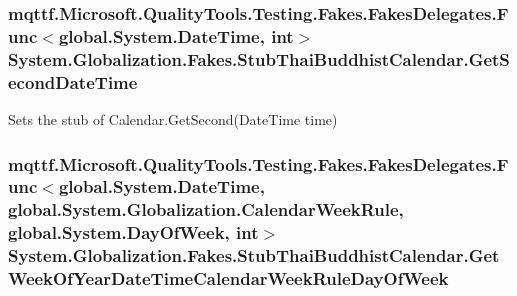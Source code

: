 \hypertarget{class_system_1_1_globalization_1_1_fakes_1_1_stub_thai_buddhist_calendar_a44f99d50865189a046508f36b6682c45}{
\subsubsection[{Get\-Second\-Date\-Time}]{\setlength{\rightskip}{0pt plus 5cm}mqttf.\-Microsoft.\-Quality\-Tools.\-Testing.\-Fakes.\-Fakes\-Delegates.\-Func$<$global.\-System.\-Date\-Time, int$>$ System.\-Globalization.\-Fakes.\-Stub\-Thai\-Buddhist\-Calendar.\-Get\-Second\-Date\-Time}}\label{class_system_1_1_globalization_1_1_fakes_1_1_stub_thai_buddhist_calendar_a44f99d50865189a046508f36b6682c45}


Sets the stub of Calendar.\-Get\-Second(\-Date\-Time time)

\hypertarget{class_system_1_1_globalization_1_1_fakes_1_1_stub_thai_buddhist_calendar_a04d31ad8b4458dfcd1e2d540c82e7cf3}{
\subsubsection[{Get\-Week\-Of\-Year\-Date\-Time\-Calendar\-Week\-Rule\-Day\-Of\-Week}]{\setlength{\rightskip}{0pt plus 5cm}mqttf.\-Microsoft.\-Quality\-Tools.\-Testing.\-Fakes.\-Fakes\-Delegates.\-Func$<$global.\-System.\-Date\-Time, global.\-System.\-Globalization.\-Calendar\-Week\-Rule, global.\-System.\-Day\-Of\-Week, int$>$ System.\-Globalization.\-Fakes.\-Stub\-Thai\-Buddhist\-Calendar.\-Get\-Week\-Of\-Year\-Date\-Time\-Calendar\-Week\-Rule\-Day\-Of\-Week}}\label{class_system_1_1_globalization_1_1_fakes_1_1_stub_thai_buddhist_calendar_a04d31ad8b4458dfcd1e2d540c82e7cf3}


